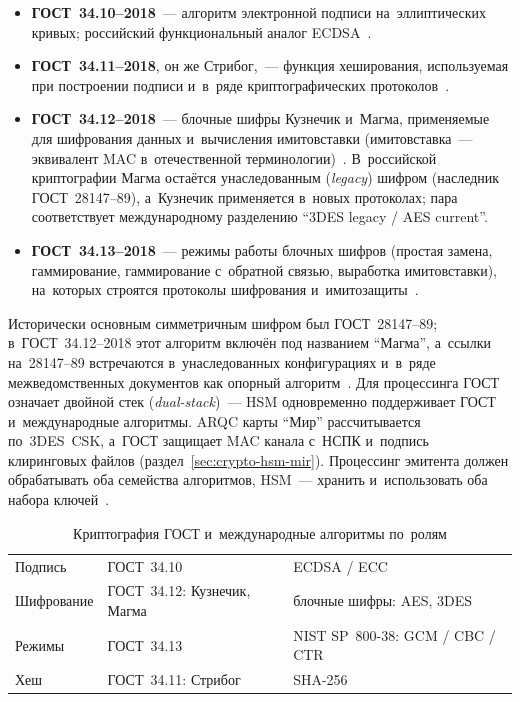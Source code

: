 \begin{itemize}
  \item \textbf{ГОСТ~34.10--2018}~--- алгоритм электронной подписи
    на~эллиптических кривых; российский функциональный аналог
    ECDSA~\cite{gost-34-10}.
  \item \textbf{ГОСТ~34.11--2018}, он же Стрибог,~--- функция хеширования,
    используемая при построении подписи и~в~ряде криптографических
    протоколов~\cite{gost-34-11}.
  \item \textbf{ГОСТ~34.12--2018}~--- блочные шифры Кузнечик и~Магма,
    применяемые для шифрования данных и~вычисления имитовставки
    (имитовставка~--- эквивалент MAC в~отечественной
    терминологии)~\cite{gost-34-12}. В~российской криптографии Магма остаётся
    унаследованным (\textit{legacy}) шифром (наследник ГОСТ~28147--89), а~Кузнечик применяется
    в~новых протоколах; пара соответствует международному разделению
    \enquote{3DES legacy / AES current}.
  \item \textbf{ГОСТ~34.13--2018}~--- режимы работы блочных шифров (простая
      замена, гаммирование, гаммирование с~обратной связью, выработка
    имитовставки), на~которых строятся протоколы шифрования
    и~имитозащиты~\cite{gost-34-13}.
\end{itemize}
Исторически основным симметричным шифром был ГОСТ~28147--89;
в~ГОСТ~34.12--2018 этот алгоритм включён под названием \enquote{Магма},
а~ссылки на~28147--89 встречаются в~унаследованных
конфигурациях и~в~ряде межведомственных документов как опорный
алгоритм~\cite{gost-28147}.
Для процессинга ГОСТ означает двойной стек (\textit{dual-stack})~--- HSM
одновременно поддерживает ГОСТ и~международные алгоритмы. ARQC карты \enquote{Мир}
рассчитывается по~3DES~CSK, а~ГОСТ защищает MAC канала с~НСПК и~подпись
клиринговых файлов (раздел~\ref{sec:crypto-hsm-mir}). Процессинг эмитента
должен обрабатывать оба семейства алгоритмов, HSM~--- хранить и~использовать
оба набора ключей~\cite{gost-34-10,gost-34-12}.

\begin{table}[tbp]
  \caption{Криптография ГОСТ и~международные алгоритмы по~ролям}\label{tab:gost-vs-international}
  \begingroup
  \tablesetup
  \begin{minipage}{\textwidth}
    \begin{tabularx}{\textwidth}{@{}B{0.2\textwidth} Y Y@{}}
      \toprule
      \headrow
       &  &  \\
      \midrule
      Подпись & ГОСТ~34.10 & ECDSA / ECC \\
      \rowsep
      Шифрование & ГОСТ~34.12: Кузнечик, Магма & блочные шифры: AES, 3DES \\
      \rowsep
      Режимы & ГОСТ~34.13 & NIST SP~800-38: GCM / CBC / CTR \\
      \rowsep
      Хеш & ГОСТ~34.11: Стрибог & SHA-256 \\
      \bottomrule
    \end{tabularx}
  \end{minipage}\par
  \endgroup
\end{table}

